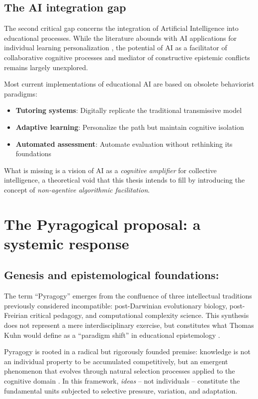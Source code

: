 \subsection{The AI integration gap}

The second critical gap concerns the integration of Artificial Intelligence into educational processes. While the literature abounds with AI applications for individual learning personalization \cite{Holmes2023}, the potential of AI as a facilitator of collaborative cognitive processes and mediator of constructive epistemic conflicts remains largely unexplored.

Most current implementations of educational AI are based on obsolete behaviorist paradigms:
\begin{itemize}
	\item \textbf{Tutoring systems}: Digitally replicate the traditional transmissive model
	\item \textbf{Adaptive learning}: Personalize the path but maintain cognitive isolation
	\item \textbf{Automated assessment}: Automate evaluation without rethinking its foundations
\end{itemize}

What is missing is a vision of AI as a \textit{cognitive amplifier} for collective intelligence, a theoretical void that this thesis intends to fill by introducing the concept of \textit{non-agentive algorithmic facilitation}.

\section{The Pyragogical proposal: a systemic response}

\subsection*{Genesis and epistemological foundations:}

The term ``Pyragogy'' emerges from the confluence of three intellectual traditions previously considered incompatible: post-Darwinian evolutionary biology, post-Freirian critical pedagogy, and computational complexity science. This synthesis does not represent a mere interdisciplinary exercise, but constitutes what Thomas Kuhn would define as a ``paradigm shift'' in educational epistemology \cite{Kuhn1962}.

Pyragogy is rooted in a radical but rigorously founded premise: knowledge is not an individual property to be accumulated competitively, but an emergent phenomenon that evolves through natural selection processes applied to the cognitive domain \cite{Dennett1995}. In this framework, \textit{ideas} -- not individuals -- constitute the fundamental units subjected to selective pressure, variation, and adaptation.

